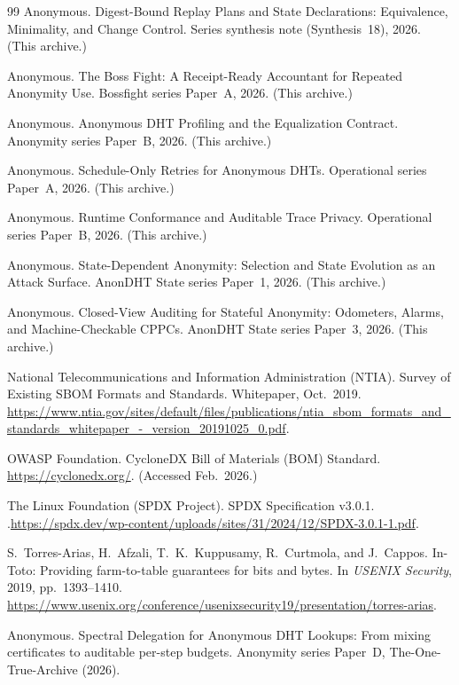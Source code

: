 \documentclass[11pt]{article}
\begin{document}
\begin{thebibliography}{99}
Anonymous.
\newblock Digest-Bound Replay Plans and State Declarations: Equivalence, Minimality, and Change Control.
\newblock Series synthesis note (Synthesis~18), 2026. (This archive.)

Anonymous.
\newblock The Boss Fight: A Receipt-Ready Accountant for Repeated Anonymity Use.
\newblock Bossfight series Paper~A, 2026. (This archive.)

Anonymous.
\newblock Anonymous DHT Profiling and the Equalization Contract.
\newblock Anonymity series Paper~B, 2026. (This archive.)

Anonymous.
\newblock Schedule-Only Retries for Anonymous DHTs.
\newblock Operational series Paper~A, 2026. (This archive.)

Anonymous.
\newblock Runtime Conformance and Auditable Trace Privacy.
\newblock Operational series Paper~B, 2026. (This archive.)

Anonymous.
\newblock State-Dependent Anonymity: Selection and State Evolution as an Attack Surface.
\newblock AnonDHT State series Paper~1, 2026. (This archive.)

Anonymous.
\newblock Closed-View Auditing for Stateful Anonymity: Odometers, Alarms, and Machine-Checkable CPPCs.
\newblock AnonDHT State series Paper~3, 2026. (This archive.)

National Telecommunications and Information Administration (NTIA).
\newblock Survey of Existing SBOM Formats and Standards.
\newblock Whitepaper, Oct.~2019.\;
\newblock \url{https://www.ntia.gov/sites/default/files/publications/ntia_sbom_formats_and_standards_whitepaper_-_version_20191025_0.pdf}.

OWASP Foundation.
\newblock CycloneDX Bill of Materials (BOM) Standard.
\newblock \url{https://cyclonedx.org/}. (Accessed Feb.~2026.)

The Linux Foundation (SPDX Project).
\newblock SPDX Specification v3.0.1.
.\;\url{https://spdx.dev/wp-content/uploads/sites/31/2024/12/SPDX-3.0.1-1.pdf}.

S.~Torres-Arias, H.~Afzali, T.~K.~Kuppusamy, R.~Curtmola, and J.~Cappos.
\newblock In-Toto: Providing farm-to-table guarantees for bits and bytes.
\newblock In \emph{USENIX Security}, 2019, pp.~1393--1410.\;
\newblock \url{https://www.usenix.org/conference/usenixsecurity19/presentation/torres-arias}.


Anonymous.
\newblock Spectral Delegation for Anonymous DHT Lookups: From mixing certificates to auditable per-step budgets.
\newblock Anonymity series Paper~D, The-One-True-Archive (2026).

\end{thebibliography}
\end{document}
